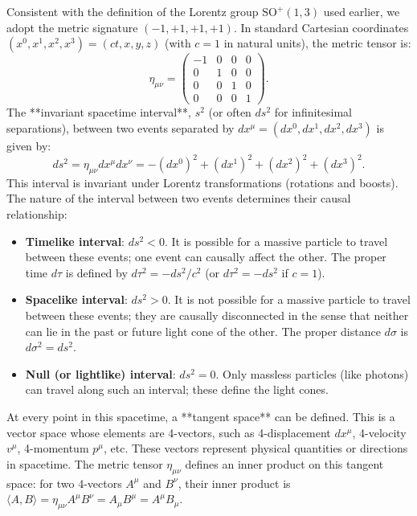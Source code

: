 \documentclass{amsart}
\theoremstyle{definition}
\theoremstyle{remark}
\begin{document}
Consistent with the definition of the Lorentz group $\mathrm{SO}^+(1,3)$ used earlier, we adopt the metric signature $(-1, +1, +1, +1)$. In standard Cartesian coordinates $(x^0, x^1, x^2, x^3) = (ct, x, y, z)$ (with $c=1$ in natural units), the metric tensor is:
\begin{equation*}
  \eta_{\mu\nu} = \begin{pmatrix} -1 & 0 & 0 & 0 \\ 0 & 1 & 0 & 0 \\ 0 & 0 & 1 & 0 \\ 0 & 0 & 0 & 1 \end{pmatrix}.
\end{equation*}
The **invariant spacetime interval**, $s^2$ (or often $ds^2$ for infinitesimal separations), between two events separated by $dx^\mu = (dx^0, dx^1, dx^2, dx^3)$ is given by:
\begin{equation*}
  ds^2 = \eta_{\mu\nu} dx^\mu dx^\nu = -(dx^0)^2 + (dx^1)^2 + (dx^2)^2 + (dx^3)^2.
\end{equation*}
This interval is invariant under Lorentz transformations (rotations and boosts). The nature of the interval between two events determines their causal relationship:
\begin{itemize}
    \item \textbf{Timelike interval}: $ds^2 < 0$. It is possible for a massive particle to travel between these events; one event can causally affect the other. The proper time $d\tau$ is defined by $d\tau^2 = -ds^2/c^2$ (or $d\tau^2 = -ds^2$ if $c=1$).
    \item \textbf{Spacelike interval}: $ds^2 > 0$. It is not possible for a massive particle to travel between these events; they are causally disconnected in the sense that neither can lie in the past or future light cone of the other. The proper distance $d\sigma$ is $d\sigma^2 = ds^2$.
    \item \textbf{Null (or lightlike) interval}: $ds^2 = 0$. Only massless particles (like photons) can travel along such an interval; these define the light cones.
\end{itemize}

At every point in this spacetime, a **tangent space** can be defined. This is a vector space whose elements are 4-vectors, such as 4-displacement $dx^\mu$, 4-velocity $v^\mu$, 4-momentum $p^\mu$, etc. These vectors represent physical quantities or directions in spacetime. The metric tensor $\eta_{\mu\nu}$ defines an inner product on this tangent space: for two 4-vectors $A^\mu$ and $B^\nu$, their inner product is $\langle A, B \rangle = \eta_{\mu\nu} A^\mu B^\nu = A_\mu B^\mu = A^\mu B_\mu$.
\end{document}

